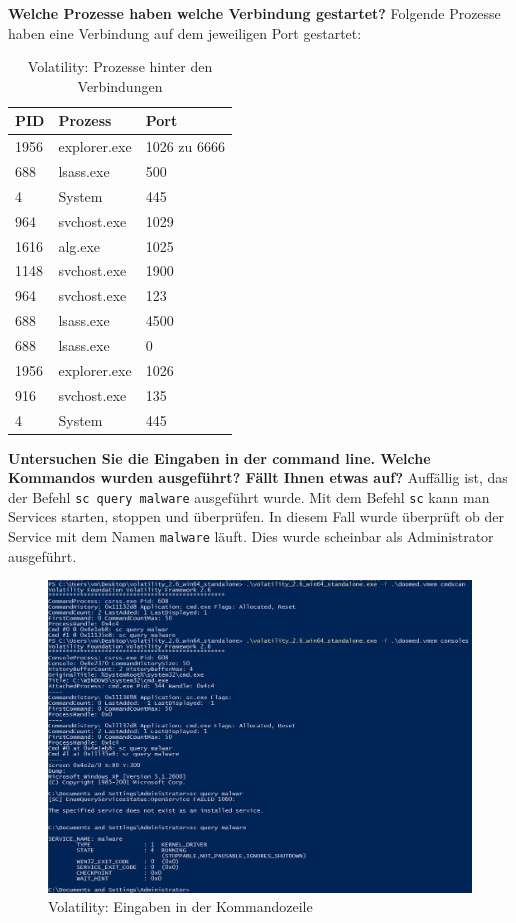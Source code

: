 \documentclass[
    a4paper,
    pagesize,
	pdftex,
    12pt,
]{scrartcl}
\begin{document}
\textbf{Welche Prozesse haben welche Verbindung gestartet?}
Folgende Prozesse haben eine Verbindung auf dem jeweiligen Port gestartet:
\begin{table}[h!]
	\begin{center}
		\label{tab:process-port}
		\begin{tabular}{l|l |l }
			\textbf{PID} & \textbf{Prozess} & \textbf{Port} \\
			\hline
			1956 & explorer.exe & 1026 zu 6666 \\
			\hline
			688 & lsass.exe & 500 \\
			4 & System &  445\\
			964 & svchost.exe & 1029 \\
			1616 & alg.exe & 1025 \\
			1148 & svchost.exe & 1900 \\
			964 & svchost.exe & 123 \\
			688 & lsass.exe & 4500 \\
			688 & lsass.exe &  0 \\
			1956 & explorer.exe & 1026 \\
			916 & svchost.exe &  135\\
			4 & System &  445\\
		\end{tabular}
		\caption{Volatility: Prozesse hinter den Verbindungen}
	\end{center}
\end{table}
\textbf{Untersuchen Sie die Eingaben in der command line. Welche Kommandos wurden ausgeführt? Fällt Ihnen etwas auf?}
Auffällig ist, das der Befehl \lstinline[breaklines]|sc query malware| ausgeführt wurde. Mit dem Befehl \lstinline[breaklines]|sc| kann man Services starten, stoppen und überprüfen. In diesem Fall wurde überprüft ob der Service mit dem Namen \lstinline[breaklines]|malware| läuft. Dies wurde scheinbar als Administrator ausgeführt.
\begin{figure}[H]
	\centering
	\includegraphics[width=18cm]{vol-cmd-history.png}
	\caption{Volatility: Eingaben in der Kommandozeile}
	\label{fig:vol-cmd-history}
\end{figure} 
\end{document}
